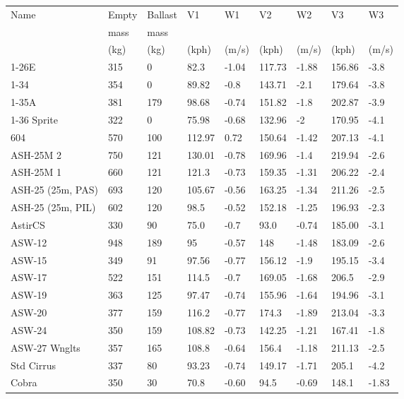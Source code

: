 \begin{maxipage}
\begin{small}
\begin{longtable}{l l l l l l l l l}
\toprule
Name & Empty & Ballast & V1 & W1 & V2 & W2 & V3 & W3 \\
     & mass       & mass         &  &  &  &  &  &  \\
     & (kg)       & (kg)         & (kph) & (m/s) & (kph) & (m/s) & (kph) & (m/s) \\
\midrule
1-26E & 315 & 0 & 82.3 & -1.04 & 117.73 & -1.88 & 156.86 & -3.8 \\
1-34 & 354 & 0 & 89.82 & -0.8 & 143.71 & -2.1 & 179.64 & -3.8 \\
1-35A & 381 & 179 & 98.68 & -0.74 & 151.82 & -1.8 & 202.87 & -3.9 \\
1-36 Sprite & 322 & 0 & 75.98 & -0.68 & 132.96 & -2 & 170.95 & -4.1 \\
604 & 570 & 100 & 112.97 & 0.72 & 150.64 & -1.42 & 207.13 & -4.1 \\
ASH-25M 2 & 750 & 121 & 130.01 & -0.78 & 169.96 & -1.4 & 219.94 & -2.6 \\
ASH-25M 1 & 660 & 121 & 121.3 & -0.73 & 159.35 & -1.31 & 206.22 & -2.4 \\
ASH-25 (25m, PAS) & 693 & 120 & 105.67 & -0.56 & 163.25 & -1.34 & 211.26 & -2.5 \\
ASH-25 (25m, PIL) & 602 & 120 & 98.5 & -0.52 & 152.18 & -1.25 & 196.93 & -2.3 \\
AstirCS & 330 & 90 & 75.0 & -0.7 & 93.0 & -0.74 & 185.00 & -3.1 \\
ASW-12 & 948 & 189 & 95 & -0.57 & 148 & -1.48 & 183.09 & -2.6 \\
ASW-15 & 349 & 91 & 97.56 & -0.77 & 156.12 & -1.9 & 195.15 & -3.4 \\
ASW-17 & 522 & 151 & 114.5 & -0.7 & 169.05 & -1.68 & 206.5 & -2.9 \\
ASW-19 & 363 & 125 & 97.47 & -0.74 & 155.96 & -1.64 & 194.96 & -3.1 \\
ASW-20 & 377 & 159 & 116.2 & -0.77 & 174.3 & -1.89 & 213.04 & -3.3 \\
ASW-24 & 350 & 159 & 108.82 & -0.73 & 142.25 & -1.21 & 167.41 & -1.8 \\
ASW-27 Wnglts & 357 & 165 & 108.8 & -0.64 & 156.4 & -1.18 & 211.13 & -2.5 \\
Std Cirrus & 337 & 80 & 93.23 & -0.74 & 149.17 & -1.71 & 205.1 & -4.2 \\
Cobra & 350 & 30 & 70.8 & -0.60 & 94.5 & -0.69 & 148.1 & -1.83 \\

\end{longtable}
\end{small}
\end{maxipage}
